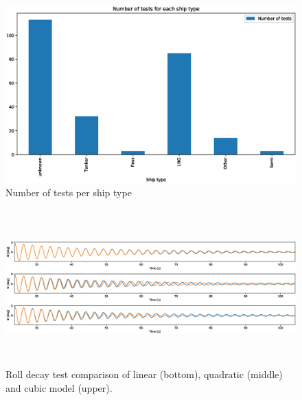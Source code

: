 \begin{figure}[H]
    \centering
    \includegraphics[width=0.5\columnwidth]{figures/ship_types.eps}
    \caption{Number of tests per ship type}
    \label{fig:ship_types}
\end{figure}

\begin{figure}[H]
    \centering
    \includegraphics[width=12cm, height = 6cm ]{figures/roll_decay_model_compare.eps}
        \vspace{-0.5cm}
    \caption{Roll decay test comparison of linear (bottom), quadratic (middle) and cubic model (upper).}
    \label{fig:roll_decay_model_compare}
\end{figure}